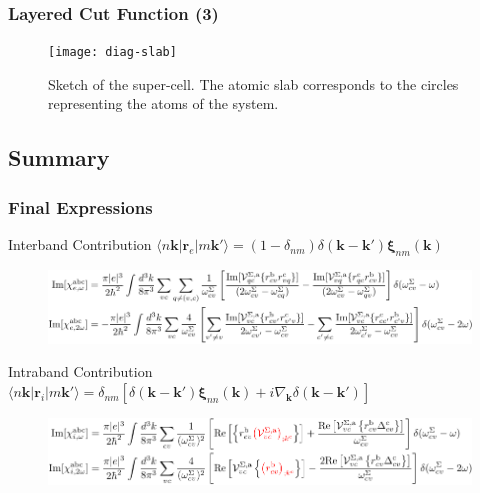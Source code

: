 \documentclass{beamer}
\begin{document}
\begin{frame}
\frametitle{Layered Cut Function (3)}
\begin{figure}
\centering
\texttt{[image: diag-slab]}
\caption{Sketch of the super-cell. The atomic slab corresponds to the circles
representing the atoms of the system.}
\end{figure}
\end{frame}


\subsection{Summary}

\begin{frame}
\frametitle{Final Expressions}
\begin{block}{Interband Contribution {\tiny $\langle n\mathbf{k}|
\mathbf{r}_{e} |m\mathbf{k}'\rangle = (1- \delta_{nm})
\delta(\mathbf{k}-\mathbf{k}')\boldsymbol{\xi}_{nm}(\mathbf{k})$}}
\begin{figure}
\centering
\includegraphics[scale=0.70]{chis_inter}
\end{figure}
\end{block}
\begin{alertblock}{Intraband Contribution {\tiny $\langle n\mathbf{k}\vert
\mathbf{r}_{i} |m\mathbf{k}'\rangle = \delta_{nm}
\left[\delta(\mathbf{k} - \mathbf{k}')\boldsymbol{\xi}_{nn}(\mathbf{k}) +
i\nabla_{\mathbf{k}}\delta(\mathbf{k} - \mathbf{k}')\right]$}}
\begin{figure}
\centering
\includegraphics[scale=0.70]{chis_intra_red}
\end{figure}
\end{alertblock}
\end{frame}
\end{document}
